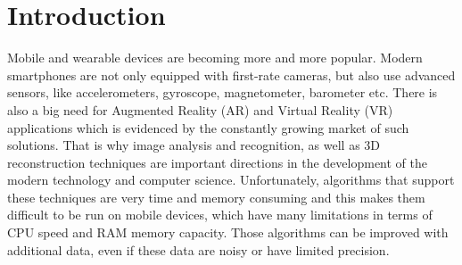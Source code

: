 
\chapter{Introduction}
\ifpdf
    \graphicspath{{1_introduction/figures/PNG/}{1_introduction/figures/PDF/}{1_introduction/figures/}}
\else
    \graphicspath{{1_introduction/figures/EPS/}{1_introduction/figures/}}
\fi


Mobile and wearable devices are becoming more and more popular. Modern smartphones are not only equipped with first-rate cameras, but also use advanced sensors, like accelerometers, gyroscope, magnetometer, barometer etc. There is also a big need for Augmented Reality (AR) and Virtual Reality (VR) applications which is evidenced by the constantly growing market of such solutions. That is why image analysis and recognition, as well as 3D reconstruction techniques are important directions in the development of the modern technology and computer science. Unfortunately, algorithms that support these techniques are very time and memory consuming and this makes them difficult to be run on mobile devices, which have many limitations in terms of CPU speed and RAM memory capacity. Those algorithms can be improved with additional data, even if these data are noisy or have limited precision. 

